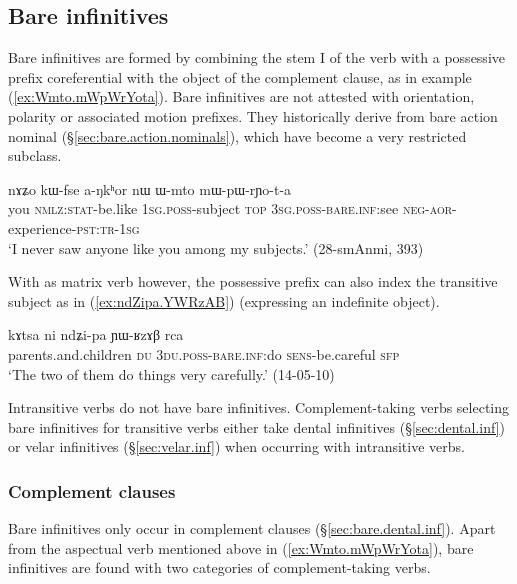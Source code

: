 \subsection{Bare infinitives} \label{sec:bare.inf}
Bare infinitives are formed by combining the stem I of the verb with a possessive prefix coreferential with the object of the complement clause, as in example (\ref{ex:Wmto.mWpWrYota}). Bare infinitives are not attested with orientation, polarity or associated motion prefixes. They historically derive from bare action nominal (§\ref{sec:bare.action.nominals}), which have become a very restricted subclass.

\begin{exe} 
\ex \label{ex:Wmto.mWpWrYota}
\gll nɤʑo kɯ-fse a-ŋkʰor nɯ ɯ-mto mɯ-pɯ-rɲo-t-a \\
you \textsc{nmlz}:\textsc{stat}-be.like \textsc{1sg}.\textsc{poss}-subject \textsc{top} \textsc{3sg}.\textsc{poss}-\textsc{bare}.\textsc{inf}:see \textsc{neg}-\textsc{aor}-experience-\textsc{pst}:\textsc{tr}-\textsc{1sg} \\
\glt `I never saw anyone like you among my subjects.' (28-smAnmi,  393)
\end{exe} 

With  as matrix verb however, the possessive prefix can also index the transitive subject as in (\ref{ex:ndZipa.YWRzAB}) (expressing an indefinite object).

\begin{exe}
\ex \label{ex:ndZipa.YWRzAB}
\gll kɤtsa ni ndʑi-pa ɲɯ-ʁzɤβ rca \\
parents.and.children \textsc{du} \textsc{3du}.\textsc{poss}-\textsc{bare}.\textsc{inf}:do \textsc{sens}-be.careful \textsc{sfp} \\
\glt `The two of them do things very carefully.' (14-05-10)
\end{exe}

Intransitive verbs do not have bare infinitives. Complement-taking verbs selecting bare infinitives for transitive verbs either take dental  infinitives (§\ref{sec:dental.inf}) or velar infinitives (§\ref{sec:velar.inf}) when occurring with intransitive verbs.

\subsubsection{Complement clauses} \label{sec:bare.inf.complement} 
Bare infinitives only occur in complement clauses (§\ref{sec:bare.dental.inf}). Apart from the aspectual verb  mentioned above in (\ref{ex:Wmto.mWpWrYota}), bare infinitives are found with two categories of complement-taking verbs.

